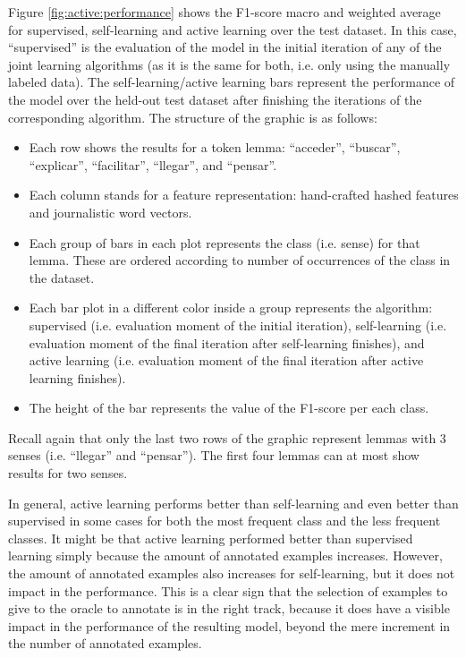 Figure \ref{fig:active:performance} shows the F1-score macro and weighted
average for supervised, self-learning and active learning over the test
dataset. In this case, ``supervised'' is the evaluation of the model in the
initial iteration of any of the joint learning algorithms (as it is the same
for both, i.e. only using the manually labeled data). The self-learning/active
learning bars represent the performance of the model over the held-out test
dataset after finishing the iterations of the corresponding algorithm. The
structure of the graphic is as follows:

\begin{itemize}
  \item Each row shows the results for a token lemma: ``acceder'', ``buscar'',
    ``explicar'', ``facilitar'', ``llegar'', and ``pensar''.
  \item Each column stands for a feature representation: hand-crafted hashed
    features and journalistic word vectors.
  \item Each group of bars in each plot represents the class (i.e. sense) for
    that lemma. These are ordered according to number of occurrences of the
    class in the dataset.
  \item Each bar plot in a different color inside a group represents the
    algorithm: supervised (i.e. evaluation moment of the initial iteration),
    self-learning (i.e. evaluation moment of the final iteration after
    self-learning finishes), and active learning (i.e. evaluation moment of the
    final iteration after active learning finishes).
  \item The height of the bar represents the value of the F1-score per each
    class.
\end{itemize}

Recall again that only the last two rows of the graphic represent lemmas with 3
senses (i.e. ``llegar'' and ``pensar''). The first four lemmas can at most show
results for two senses.

In general, active learning performs better than self-learning and even better
than supervised in some cases for both the most frequent class and the less
frequent classes. It might be that active learning performed better than
supervised learning simply because the amount of annotated examples increases.
However, the amount of annotated examples also increases for self-learning, but
it does not impact in the performance. This is a clear sign that the selection
of examples to give to the oracle to annotate is in the right track, because it
does have a visible impact in the performance of the resulting model, beyond
the mere increment in the number of annotated examples.

